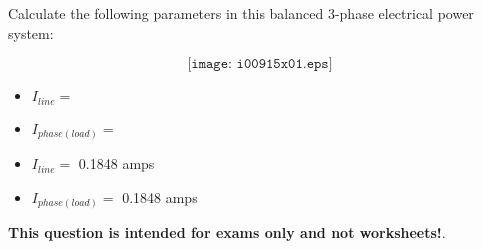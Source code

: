 

Calculate the following parameters in this balanced 3-phase electrical power system:

$$\texttt{[image: i00915x01.eps]}$$

\begin{itemize}
\item{} $I_{line} =$
\vskip 10pt
\item{} $I_{phase(load)} =$
\end{itemize}







\begin{itemize}
\item{} $I_{line} =$ 0.1848 amps
\vskip 10pt
\item{} $I_{phase(load)} =$ 0.1848 amps
\end{itemize}








{\bf This question is intended for exams only and not worksheets!}.




